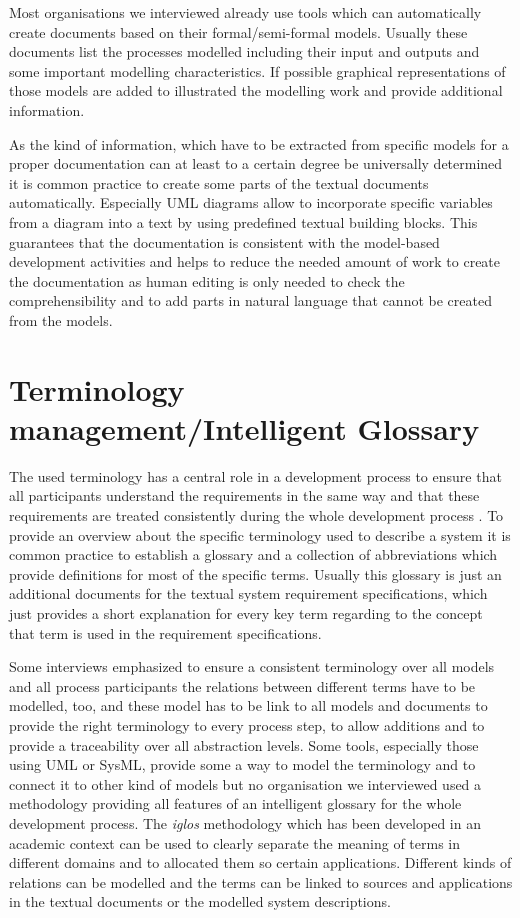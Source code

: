 \documentclass{./template/openetcs_report}
\begin{document}
Most organisations we interviewed already use tools which can automatically create documents based on their formal/semi-formal models. Usually these documents list the processes modelled including their input and outputs and some important modelling characteristics. If possible graphical representations of those models are added to illustrated the modelling work and provide additional information.

As the kind of information, which have to be extracted from specific models for a proper documentation can at least to a certain degree be universally determined it is common practice to 
create some parts of the textual documents automatically. Especially UML diagrams allow to incorporate specific variables from a diagram into a text by using predefined textual building blocks. This guarantees that the documentation is consistent with the model-based development activities and helps to reduce the needed amount of work to create the documentation as human editing is only needed to check the comprehensibility and to add parts in natural language that cannot be created from the models.

\section{Terminology management/Intelligent Glossary}

The used terminology has a central role in a development process to ensure that all participants understand the requirements in the same way and that these requirements are treated consistently during the whole development process \citep{Schnieder.2010}. To provide an overview about the specific terminology used to describe a system it is common practice to establish a glossary and a collection of abbreviations which provide definitions for most of the specific terms. Usually this glossary is just an additional documents for the textual system requirement specifications, which just provides a short explanation for every key term regarding to the concept that term is used in the requirement specifications. 

Some interviews emphasized to ensure a consistent terminology over all models and all process participants the relations between different terms have to be modelled, too, and these model has to be link to all models and documents to provide the right terminology to every process step, to allow additions and to provide a traceability over all abstraction levels. Some tools, especially those using UML or SysML, provide some a way to model the terminology and to connect it to other kind of models but no organisation we interviewed used a methodology providing all features of an intelligent glossary for the whole development process. The \textit{iglos} methodology which has been developed in an academic context can be used to clearly separate the meaning of terms in different domains and to allocated them so certain applications. Different kinds of relations can be modelled and the terms can be linked to sources and applications in the textual documents or the modelled system descriptions.
\end{document}
